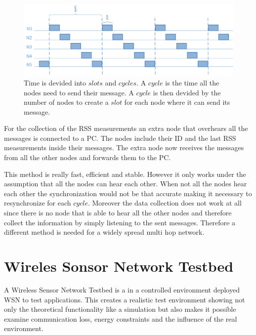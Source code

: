 \begin{figure}[htbp]
	\centering
    \includegraphics[scale=0.8]{content/images/Multispin}
   	\caption{Time is devided into $slots$ and $cycles$. A $cycle$ is the time all the nodes need to send their message. A $cycle$ is then devided by the number of nodes to create a $slot$ for each node where it can send its message. \cite{RtiMulti}}
    \label{fig:multi}
\end{figure}

For the collection of the RSS measurements an extra node that overhears all the messages is connected to a PC. The nodes include their ID and the last RSS measurements inside their messages. The extra node now receives the messages from all the other nodes and forwards them to the PC.  \cite{RtiMulti}

This method is really fast, efficient and stable. However it only works under the assumption that all the nodes can hear each other. When not all the nodes hear each other the synchronization would not be that accurate making it necessary to resynchronize for each $cycle$. Moreover the data collection does not work at all since there is no node that is able to hear all the other nodes and therefore collect the information by simply listening to the sent messages.
Therefore a different method is needed for a widely spread multi hop network.

 
\section{Wireles Sonsor Network Testbed}
\label{chp:mat_testbed}
A Wireless Sensor Network Testbed is a in a controlled environment deployed WSN to test applications. This creates a realistic test environment showing not only the theoretical functionality like a simulation but also makes it possible examine communication loss, energy constraints and the influence of the real environment.  

